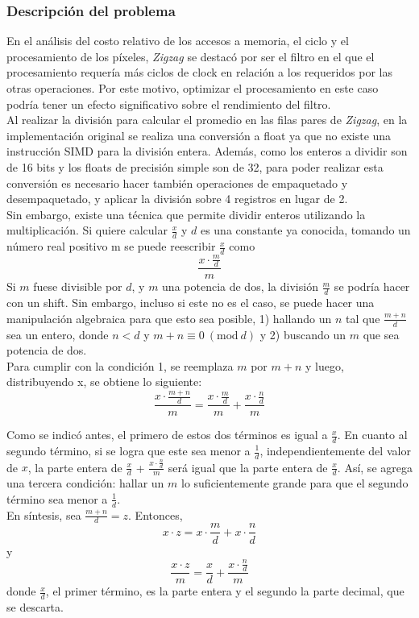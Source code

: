 \documentclass[a4paper]{article}
\newcommand{\Mod}[1]{\ (\mathrm{mod}\ #1)}
\begin{document}
\subsubsection{Descripción del problema}
En el análisis del costo relativo de los accesos a memoria, el ciclo y el procesamiento de los píxeles, \textit{Zigzag} se destacó por ser el filtro en el que el procesamiento requería más ciclos de clock en relación a los requeridos por las otras operaciones. Por este motivo, optimizar el procesamiento en este caso podría tener un efecto significativo sobre el rendimiento del filtro. \\
Al realizar la división para calcular el promedio en las filas pares de \textit{Zigzag}, en la implementación original se realiza una conversión a float ya que no existe una instrucción SIMD para la división entera. Además, como los enteros a dividir son de 16 bits y los floats de precisión simple son de 32, para poder realizar esta conversión es necesario hacer también operaciones de empaquetado y desempaquetado, y aplicar la división sobre 4 registros en lugar de 2. \\
Sin embargo, existe una técnica que permite dividir enteros utilizando la multiplicación. Si quiere calcular $\frac{x}{d}$ y $d$ es una constante ya conocida, tomando un número real positivo m se puede reescribir $\frac{x}{d}$ como
\begin{equation}
\frac{x\cdot\frac{m}{d}}{m}
\end{equation}
Si $m$ fuese divisible por $d$, y $m$ una potencia de dos, la división $\frac{m}{d}$ se podría hacer con un shift. Sin embargo, incluso si este no es el caso, se puede hacer una manipulación algebraica para que esto sea posible, 1) hallando un $n$ tal que $\frac{m+n}{d}$ sea un entero, donde $n < d$ y $m + n \equiv 0 \Mod{d}$ y 2) buscando un $m$ que sea potencia de dos. \\
Para cumplir con la condición 1, se reemplaza $m$ por $m+n$ y luego, distribuyendo x, se obtiene lo siguiente: 
\begin{equation}
\frac{x\cdot\frac{m+n}{d}}{m} = \frac{x\cdot\frac{m}{d}}{m} + \frac{x\cdot\frac{n}{d}}{m}
\end{equation}

Como se indicó antes, el primero de estos dos términos es igual a $\frac{x}{d}$. En cuanto al segundo término, si se logra que este sea menor a $\frac{1}{d}$, independientemente del valor de $x$, la parte entera de $\frac{x}{d}$ + $\frac{x\cdot\frac{n}{d}}{m}$ será igual que la parte entera de $\frac{x}{d}$. Así, se agrega una tercera condición: hallar un $m$ lo suficientemente grande para que el segundo término sea menor a $\frac{1}{d}$. \\
En síntesis, sea  $\frac{m+n}{d} = z$. Entonces,
\begin{equation}
x\cdot z = x\cdot\frac{m}{d} + x\cdot\frac{n}{d}
\end{equation}
y
\begin{equation}
\frac{x\cdot z}{m} = \frac{x}{d} + \frac{x\cdot\frac{n}{d}}{m}
\end{equation}
donde $\frac{x}{d}$, el primer término, es la parte entera y el segundo la parte decimal, que se descarta.
\end{document}
